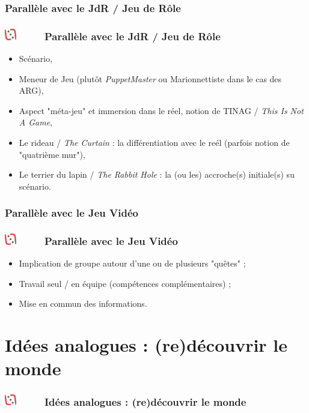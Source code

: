 \documentclass[slidetop,11pt]{beamer}
\def\moreInFrameTitleLeftt{\includegraphics[height=0.5cm]{img/ligueludique-0.png}~~~~~}
\begin{document}
\def\sectionPartIIcII{Parall{\`e}le avec le JdR / Jeu de R{\^o}le}
\subsubsection{\sectionPartIIcII} %
\begin{frame}
	\frametitle{\moreInFrameTitleLeftt \sectionPartIIcII }
	\begin{itemize}
		\item Sc{\'e}nario, 
		\item Meneur de Jeu (plut{\^o}t \emph{PuppetMaster} ou Marionnettiste dans le cas des ARG), 
		\item Aspect "m{\'e}ta-jeu" et immersion dans le r{\'e}el, notion de TINAG / \emph{This Is Not A Game}, 
		\item Le rideau / \emph{The Curtain} : la diff{\'e}rentiation avec le re{\'e}l (parfois notion de "quatri{\`e}me mur"), 
		\item Le terrier du lapin / \emph{The Rabbit Hole} : la (ou les) accroche(s) initiale(s) su sc{\'e}nario. 
	\end{itemize}
\end{frame} 

\def\sectionPartIIcIII{Parall{\`e}le avec le Jeu Vid{\'e}o}
\subsubsection{\sectionPartIIcIII} %
\begin{frame}
	\frametitle{\moreInFrameTitleLeftt \sectionPartIIcIII }
	\begin{itemize}
		\item Implication de groupe autour d'une ou de plusieurs "qu{\^e}tes" ; 
		\item Travail seul / en {\'e}quipe (comp{\'e}tences compl{\'e}mentaires) ; 
		\item Mise en commun des informations. 
	\end{itemize}
\end{frame} 


\def\sectionPartIII{Id{\'e}es analogues : (re)d{\'e}couvrir le monde}
\section{\sectionPartIII}
\begin{frame}
	\frametitle{\moreInFrameTitleLeftt \sectionPartIII}
	\tableofcontents[sections=3,currentsection,subsectionstyle=show/shaded/hide] %
\end{frame} 
\end{document}
